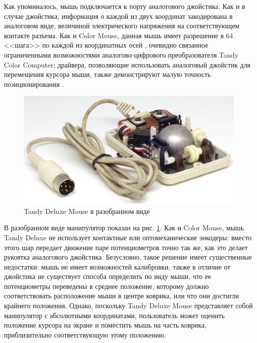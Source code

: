 \documentclass[11pt, a4paper]{article}
\begin{document}
Как упоминалось, мышь подключается к порту аналогового джойстика. Как и в случае джойстика, информация о каждой из двух координат закодирована в аналоговом виде, величиной электрического напряжения на соответствующем контакте разъема. Как и Color Mouse, данная мышь имеет разрешение в 64 <<шага>> по каждой из координатных осей \cite{manual}, очевидно связанное ограниченными возможностями аналогово-цифрового преобразователя Tandy Color Computer; драйвера, позволяющие использовать аналоговый джойстик для перемещения курсора мыши, также демонстрируют малую точность позиционирования \cite{hierophant}.

\begin{figure}[h]
    \centering
    \includegraphics[scale=0.8]{1988_tandy_trs80_deluxe_mouse/inside_30.jpg}
    \caption{Tandy Deluxe Mouse в разобранном виде}
    \label{fig:TandyDeluxeMouseInside}
\end{figure}

В разобранном виде манипулятор показан на рис. \ref{fig:TandyDeluxeMouseInside}. Как и Color Mouse, мышь Tandy Deluxe не использует контактные или оптомеханические энкодеры: вместо этого шар передает движение паре потенциометров точно так же, как это делает рукоятка аналогового джойстика. Безусловно, такое решение имеет существенные недостатки: мышь не имеет возможностей калибровки, также в отличие от джойстика не существует способа определить по виду мыши, что ее потенциометры переведены в среднее положение, которому должно соответствовать расположение мыши в центре коврика, или что они достигли крайнего положения. Однако, поскольку Tandy Deluxe Mouse представляет собой манипулятор с абсолютными координатами, пользователь может оценить положение курсора на экране и поместить мышь на часть коврика, приблизительно соответствующую этому положению.
\end{document}
